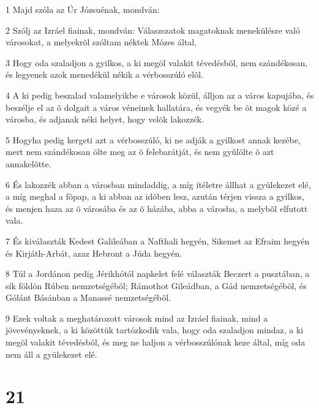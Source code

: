 \par 1 Majd szóla az Úr Józsuénak, mondván:
\par 2 Szólj az Izráel fiainak, mondván: Válaszszatok magatoknak menekülésre való városokat, a melyekrõl szóltam néktek Mózes által,
\par 3 Hogy oda szaladjon a gyilkos, a ki megöl valakit tévedésbõl, nem szándékosan, és legyenek azok menedékül nékik a vérbosszúló elõl.
\par 4 A ki pedig beszalad valamelyikbe e városok közül, álljon az a város kapujába, és beszélje el az õ dolgait a város véneinek hallatára, és vegyék be õt magok közé a városba, és adjanak néki helyet, hogy velök lakozzék.
\par 5 Hogyha pedig kergeti azt a vérbosszúló, ki ne adják a gyilkost annak kezébe, mert nem szándékosan ölte meg az õ felebarátját, és nem gyûlölte õ azt annakelõtte.
\par 6 És lakozzék abban a városban mindaddig, a míg ítéletre állhat a gyülekezet elé, a míg meghal a fõpap, a ki abban az idõben lesz, azután térjen vissza a gyilkos, és menjen haza az õ városába és az õ házába, abba a városba, a melybõl elfutott vala.
\par 7 És kiválaszták Kedest Galileában a Nafthali hegyén, Sikemet az Efraim hegyén és Kirjáth-Arbát,  azaz Hebront a Júda hegyén.
\par 8 Túl a Jordánon pedig Jérikhótól napkelet felé választák Beczert a pusztában, a sík földön Rúben nemzetségébõl; Rámothot Gileádban, a Gád nemzetségébõl, és Gólánt Básánban a Manassé nemzetségébõl.
\par 9 Ezek voltak a meghatározott városok mind az Izráel fiainak, mind a jövevényeknek, a ki közöttük tartózkodik vala, hogy oda szaladjon mindaz, a ki megöl valakit tévedésbõl, és meg ne haljon a vérbosszúlónak keze által, míg oda nem áll a gyülekezet elé.

\chapter{21}

